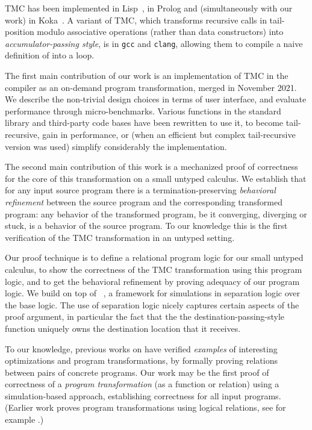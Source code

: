 TMC has been implemented in Lisp~\citep*{risch-73,friedman-wise-75}, in Prolog and (simultaneously with our work) in Koka~\citep*{tmc-koka-2023}. A variant of TMC, which transforms recursive calls in tail-position modulo associative operations (rather than data constructors) into \emph{accumulator-passing style}, is in \texttt{gcc} and \texttt{clang}, allowing them to compile a naive definition of  into a loop.

The first main contribution of our work is an implementation of TMC in the \OCaml compiler as an on-demand program transformation,
merged in November 2021.
%
We describe the non-trivial design choices in terms of user interface, and evaluate performance through micro-benchmarks.
%
Various functions in the standard library and third-party code bases have been rewritten to use it, to become tail-recursive, gain in performance, or (when an efficient but complex tail-recursive version was used) simplify considerably the implementation.

The second main contribution of this work is a mechanized proof of correctness for the core of this transformation on a small untyped calculus.
%
We establish that for any input source program there is a termination-preserving \emph{behavioral refinement} between the source program and the corresponding transformed program: any behavior of the transformed program, be it converging, diverging or stuck, is a behavior of the source program.
%
To our knowledge this is the first verification of the TMC transformation in an untyped setting.

Our proof technique is to define a relational program logic for our small untyped calculus, to show the correctness of the TMC transformation using this program logic, and to get the behavioral refinement by proving adequacy of our program logic. We build on top of \Simuliris~\citep*{simuliris-2022}, a framework for simulations in separation logic over the \Iris base logic. The use of separation logic nicely captures certain aspects of the proof argument, in particular the fact that the the destination-passing-style function uniquely owns the destination location that it receives.

To our knowledge, previous works on \Simuliris have verified \emph{examples} of interesting optimizations and program transformations, by formally proving relations between pairs of concrete programs. Our work may be the first proof of correctness of a \emph{program transformation} (as a function or relation) using a simulation-based approach, establishing correctness for all input programs. (Earlier \Iris work proves program transformations using logical relations, see for example \citet*{tassarotti-2017}.)

